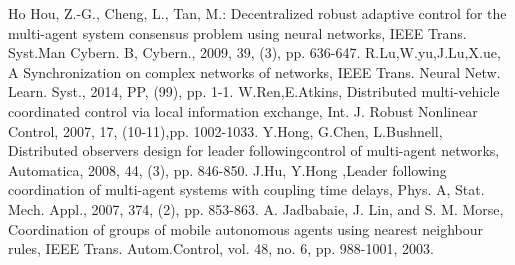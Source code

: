 \begin{thebibliography}{99}
   Ho Hou, Z.-G., Cheng, L., Tan, M.: Decentralized robust adaptive control for the multi-agent system consensus problem using neural networks, IEEE Trans. Syst.Man Cybern. B, Cybern., 2009, 39, (3), pp. 636-647.
	 R.Lu,W.yu,J.Lu,X.ue, A Synchronization on complex networks of networks, IEEE Trans. Neural Netw. Learn. Syst., 2014, PP, (99), pp. 1-1.
	W.Ren,E.Atkins, Distributed multi-vehicle coordinated control via local information exchange, Int. J. Robust Nonlinear Control, 2007, 17, (10-11),pp. 1002-1033.
	Y.Hong, G.Chen, L.Bushnell, Distributed observers design for leader followingcontrol of multi-agent networks, Automatica, 2008, 44, (3), pp. 846-850.
     J.Hu, Y.Hong ,Leader following coordination of multi-agent systems with coupling time delays, Phys. A, Stat. Mech. Appl., 2007, 374, (2), pp. 853-863.
    A. Jadbabaie, J. Lin, and S. M. Morse, Coordination of groups of mobile autonomous agents using nearest neighbour rules, IEEE Trans. Autom.Control, vol. 48, no. 6, pp. 988-1001, 2003.
    

\end{thebibliography}
